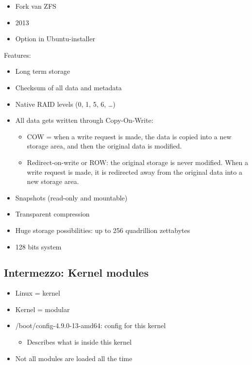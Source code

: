 \documentclass{article}
\begin{document}
\begin{itemize}
    \item Fork van ZFS
    \item 2013
    \item Option in Ubuntu-installer
\end{itemize}

Features:

\begin{itemize}
    \item Long term storage
    \item Checksum of all data and metadata
    \item Native RAID levels (0, 1, 5, 6, \dots)
    \item All data gets written through Copy-On-Write:
    \begin{itemize}
        \item COW = when a write request is made, the data is copied into a new storage area, and then the original data is modified.
        \item Redirect-on-write or ROW: the original storage is never modified. When a write request is made, it is redirected away from the original data into a new storage area.
    \end{itemize}
    \item Snapshots (read-only and mountable)
    \item Transparent compression
    \item Huge storage possibilities: up to 256 quadrillion zettabytes
    \item 128 bits system
\end{itemize}

\subsection{Intermezzo: Kernel modules}

\begin{itemize}
    \item Linux = kernel
    \item Kernel = modular
    \item /boot/config-4.9.0-13-amd64: config for this kernel
    \begin{itemize}
        \item Describes what is inside this kernel
    \end{itemize}
    \item Not all modules are loaded all the time
\end{itemize}
\end{document}
